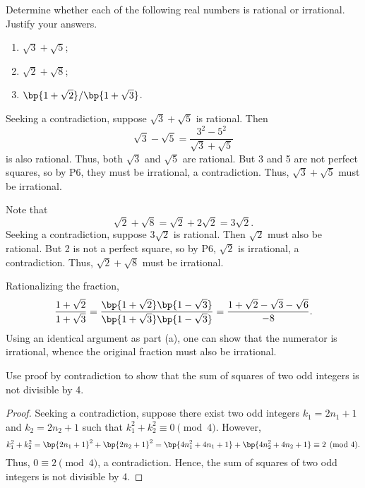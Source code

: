 \begin{problem}
    Determine whether each of the following real numbers is rational or irrational. Justify your answers.
    
    \begin{enumerate}
        \item $\sqrt3 + \sqrt5$;
        \item $\sqrt2 + \sqrt8$;
        \item $\bp{1 + \sqrt2} / \bp{1 + \sqrt3}$.
    \end{enumerate}
\end{problem}
\begin{solution}
    \begin{ppart}
        Seeking a contradiction, suppose $\sqrt 3 + \sqrt 5$ is rational. Then \[\sqrt 3 - \sqrt 5 = \frac{3^2 - 5^2}{\sqrt3 + \sqrt5}\] is also rational. Thus, both $\sqrt3$ and $\sqrt5$ are rational. But 3 and 5 are not perfect squares, so by P6, they must be irrational, a contradiction. Thus, $\sqrt3 + \sqrt5$ must be irrational.
    \end{ppart}
    \begin{ppart}
        Note that \[\sqrt 2 + \sqrt8 = \sqrt2 + 2\sqrt2 = 3 \sqrt2.\] Seeking a contradiction, suppose $3\sqrt2$ is rational. Then $\sqrt2$ must also be rational. But 2 is not a perfect square, so by P6, $\sqrt2$ is irrational, a contradiction. Thus, $\sqrt2 + \sqrt8$ must be irrational.
    \end{ppart}
    \begin{ppart}
        Rationalizing the fraction, \[\frac{1 + \sqrt2}{1 + \sqrt3} = \frac{\bp{1 + \sqrt2}\bp{1 - \sqrt3}}{\bp{1 + \sqrt3}\bp{1 - \sqrt3}} = \frac{1 + \sqrt2 - \sqrt3 - \sqrt6}{-8}.\] Using an identical argument as part (a), one can show that the numerator is irrational, whence the original fraction must also be irrational.
    \end{ppart}
\end{solution}

\begin{problem}
    Use proof by contradiction to show that the sum of squares of two odd integers is not divisible by 4.
\end{problem}
\begin{proof}
    Seeking a contradiction, suppose there exist two odd integers $k_1 = 2n_1 + 1$ and $k_2 = 2n_2 + 1$ such that $k_1^2 + k_2^2 \equiv 0 \pmod{4}$. However, \[k_1^2 + k_2^2 = \bp{2n_1 + 1}^2 + \bp{2n_2 + 1}^2 = \bp{4n_1^2 + 4n_1 + 1} + \bp{4n_2^2 + 4n_2 + 1} \equiv 2 \pmod{4}.\] Thus, $0 \equiv 2 \pmod{4}$, a contradiction. Hence, the sum of squares of two odd integers is not divisible by 4.
\end{proof}

